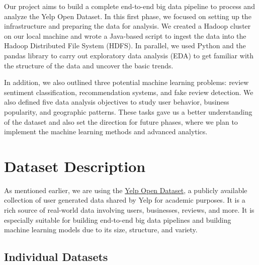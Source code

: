 \documentclass[conference]{IEEEtran}
\begin{document}
Our project aims to build a complete end-to-end big data pipeline to process and
analyze the Yelp Open Dataset. In this first phase, we focused on setting up the
infrastructure and preparing the data for analysis. We created a Hadoop cluster
on our local machine and wrote a Java-based script to ingest the data into the Hadoop
Distributed File System (HDFS). In parallel, we used Python and the pandas library
to carry out exploratory data analysis (EDA) to get familiar with the structure
of the data and uncover the basic trends.

In addition, we also outlined three potential machine learning problems: review
sentiment classification, recommendation systems, and fake review detection. We
also defined five data analysis objectives to study user behavior, business
popularity, and geographic patterns. These tasks gave us a better
understanding of the dataset and also set the direction for future phases, where
we plan to implement the machine learning methods and advanced analytics.

\section{Dataset Description}

As mentioned earlier, we are using the \href{https://business.yelp.com/data/resources/open-dataset/}{Yelp Open Dataset},
a publicly available collection of user generated data shared by Yelp for academic
purposes. It is a rich source of real-world data involving users, businesses, reviews,
and more. It is especially suitable for building end-to-end big data pipelines
and building machine learning models due to its size, structure, and variety.

\subsection{Individual Datasets}
\end{document}

